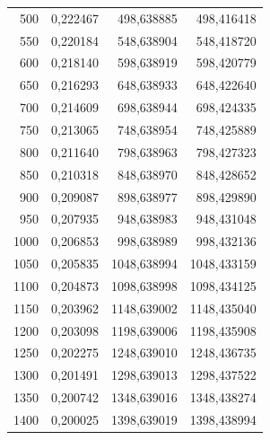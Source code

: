 \begin{table}[htbp]
\begin{tabular}{rrrr}
       500 &   0,222467 & 498,638885 & 498,416418 \\

       550 &   0,220184 & 548,638904 & 548,418720 \\

       600 &   0,218140 & 598,638919 & 598,420779 \\

       650 &   0,216293 & 648,638933 & 648,422640 \\

       700 &   0,214609 & 698,638944 & 698,424335 \\

       750 &   0,213065 & 748,638954 & 748,425889 \\

       800 &   0,211640 & 798,638963 & 798,427323 \\

       850 &   0,210318 & 848,638970 & 848,428652 \\

       900 &   0,209087 & 898,638977 & 898,429890 \\

       950 &   0,207935 & 948,638983 & 948,431048 \\

      1000 &   0,206853 & 998,638989 & 998,432136 \\

      1050 &   0,205835 & 1048,638994 & 1048,433159 \\

      1100 &   0,204873 & 1098,638998 & 1098,434125 \\

      1150 &   0,203962 & 1148,639002 & 1148,435040 \\

      1200 &   0,203098 & 1198,639006 & 1198,435908 \\

      1250 &   0,202275 & 1248,639010 & 1248,436735 \\

      1300 &   0,201491 & 1298,639013 & 1298,437522 \\

      1350 &   0,200742 & 1348,639016 & 1348,438274 \\

      1400 &   0,200025 & 1398,639019 & 1398,438994 \\
\hline
\end{tabular}  
\end{table}
		
